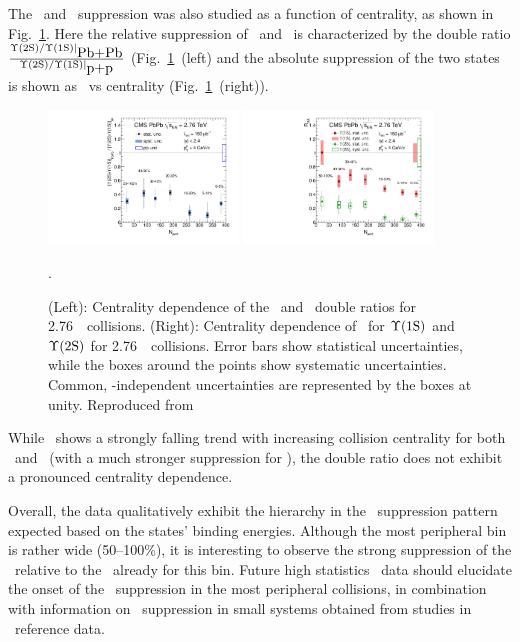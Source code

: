 The \PgUa\ and \PgUb\ suppression was also studied as a function of centrality, 
as shown in Fig.~\ref{fig:GR:centrality}.
Here the relative suppression of \PgUa\ and \PgUb\ is characterized by 
the double ratio $\frac{\Upsilon\mathrm{(2S)}/\Upsilon\mathrm{(1S)}|_{\mbox{Pb+Pb}}}{\Upsilon\mathrm{(2S)}/\Upsilon\mathrm{(1S)}|_{\mbox{p+p}}}$ 
(Fig.~\ref{fig:GR:centrality}~(left) and the absolute suppression 
of the two states is shown as \Raa\ vs centrality (Fig.~\ref{fig:GR:centrality}~(right)).

\begin{figure}[t]
\begin{center}
   \includegraphics[width=0.45\textwidth]{qqbarfigures/chi2VsCent}
   \includegraphics[width=0.45\textwidth]{qqbarfigures/RaaPt4}
  \caption{(Left): Centrality dependence of the \PgUa\ and \PgUb\ double ratios
for 2.76\TeV\ \PbPb\ collisions.  (Right): 
Centrality dependence of \Raa\ for $\Upsilon\mathrm{(1S)}$ and $\Upsilon\mathrm{(2S)}$ for 2.76\TeV\ \PbPb\ collisions.
Error bars show statistical uncertainties, while the boxes around the points
show systematic uncertainties. Common, \npart-independent 
uncertainties are represented by the boxes at unity. Reproduced from~\cite{}}.
\label{fig:GR:centrality}
\end{center}
\end{figure}

While \Raa\ shows a strongly falling trend with increasing collision centrality
for both \PgUa\ and \PgUb\ (with a much stronger suppression for \PgUb), the 
double ratio does not exhibit a pronounced centrality dependence.

Overall, the data qualitatively exhibit the hierarchy in the \PgUn\ suppression pattern
expected based on the states' binding energies. Although the most peripheral bin
is rather wide (50--100\%), it is interesting to observe the strong suppression of the 
\PgUb\ relative to the \PgUa\ already for this bin. Future high statistics \PbPb\ data 
should elucidate the onset of the \PgU\ suppression in the most peripheral collisions,
in combination with information on \PgU\ suppression in small systems obtained from
studies in \pPb\ reference data. 

